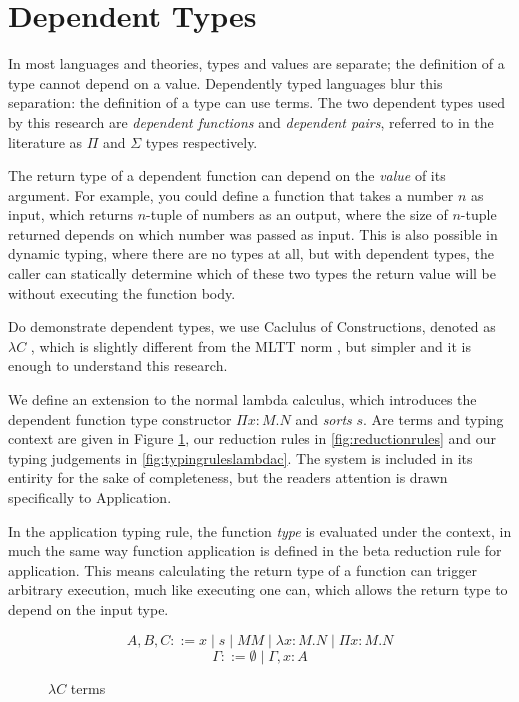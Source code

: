 \documentclass[12pt,twoside]{report}
\begin{document}
\section{Dependent Types}
In most languages and theories, types and values are separate; the definition of a type cannot depend on a value. Dependently typed languages blur this separation: the definition of a type can use terms. The two dependent types used by this research are \textit{dependent functions} and \textit{dependent pairs}, referred to in the literature as $\Pi$ and $\Sigma$ types respectively.

The return type of a dependent function can depend on the \textit{value} of its argument. For example, you could define a function that takes a number $n$ as input, which returns $n$-tuple of numbers as an output, where the size of $n$-tuple returned depends on which number was passed as input. This is also possible in dynamic typing, where there are no types at all, but with dependent types, the caller can statically determine which of these two types the return value will be without executing the function body.

Do demonstrate dependent types, we use Caclulus of Constructions, denoted as $\lambda C$ \citep{barendregtIntroductionGeneralizedType1991}, which is slightly different from the MLTT norm \citep{martin-lofperandsambingiovanniIntuitionisticTypeTheory1984}, but simpler and it is enough to understand this research.

We define an extension to the normal lambda calculus, which introduces the dependent function type constructor $\Pi x : M. N$ and \textit{sorts} $s$. Are terms and typing context are given in Figure \ref{fig:lambdacterms}, our reduction rules in \ref{fig:reductionrules} and our typing judgements in \ref{fig:typingruleslambdac}. The system is included in its entirity for the sake of completeness, but the readers attention is drawn specifically to Application.

In the application typing rule, the function \textit{type} is evaluated under the context, in much the same way function application is defined in the beta reduction rule for application. This means calculating the return type of a function can trigger arbitrary execution, much like executing one can, which allows the return type to depend on the input type.

\begin{figure}
  \[
    A, B, C ::= x \mid s \mid M M \mid \lambda x : M. N \mid \Pi x : M. N
  \]\[
    \Gamma ::= \emptyset \mid \Gamma,x:A
  \]
  \caption{$\lambda C$ terms}
  \label{fig:lambdacterms}
\end{figure}
\end{document}

